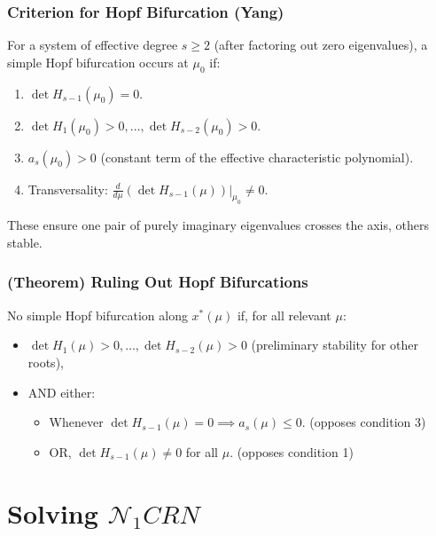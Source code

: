 \documentclass[aspectratio=169]{beamer}
\begin{document}
\begin{frame}{\insertsectionhead}
\frametitle{Criterion for Hopf Bifurcation (Yang)}
For a system of effective degree $s \ge 2$ (after factoring out zero eigenvalues), a simple Hopf bifurcation occurs at $\mu_0$ if:
\begin{enumerate}
	\item $\det H_{s-1}(\mu_0) = 0$.
	\item $\det H_1(\mu_0) > 0, \dots, \det H_{s-2}(\mu_0) > 0$.
	\item $a_s(\mu_0) > 0$ (constant term of the effective characteristic polynomial).
	\item Transversality: $\frac{d}{d\mu}(\det H_{s-1}(\mu))\bigg|_{\mu_0} \neq 0$.
\end{enumerate}
These ensure one pair of purely imaginary eigenvalues crosses the axis, others stable.
\end{frame}

\begin{frame}{\insertsectionhead}\label{thm:rule-out-bifurcations}
\frametitle{(Theorem) Ruling Out Hopf Bifurcations}
No simple Hopf bifurcation along $x^*(\mu)$ if, for all relevant $\mu$:
\begin{itemize}
	\item $\det H_1(\mu) > 0, \dots, \det H_{s-2}(\mu) > 0$ (preliminary stability for other roots),
	\item AND either:
		\begin{itemize}
			\item Whenever $\det H_{s-1}(\mu) = 0 \implies a_s(\mu) \le 0$. (opposes condition 3)
			\item OR, $\det H_{s-1}(\mu) \neq 0$ for all $\mu$. (opposes condition 1)
		\end{itemize}
\end{itemize}
\end{frame}

\section{Solving $\mathcal{N}_1 CRN$}
\end{document}
